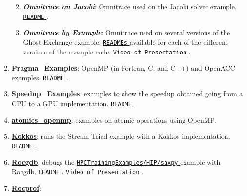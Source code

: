 \documentclass[
]{article}
\providecommand{\tightlist}{%
  \setlength{\itemsep}{0pt}\setlength{\parskip}{0pt}}
\let\oldtexttt\texttt
\renewcommand{\texttt}[1]{
  \colorbox{Light}{\oldtexttt{#1}}
}
\providecommand{\tightlist}{%
  \setlength{\itemsep}{0pt}\setlength{\parskip}{0pt}}
\begin{document}
\begin{enumerate}
  \begin{enumerate}
  \def\labelenumii{\arabic{enumii}.}
  \tightlist
  \item
    \textbf{\emph{Omnitrace on Jacobi}}: Omnitrace used on the Jacobi
    solver example.
    \href{https://github.com/amd/HPCTrainingExamples/tree/main/Omnitrace/README.md}{\texttt{README}}.
  \item
    \textbf{\emph{Omnitrace by Example}}: Omnitrace used on several
    versions of the Ghost Exchange example.
    \href{https://github.com/amd/HPCTrainingExamples/blob/main/MPI-examples/GhostExchange/GhostExchange_ArrayAssign}{\texttt{READMEs}}
    available for each of the different versions of the example code.
    \href{https://vimeo.com/951998260}{\texttt{Video\ of\ Presentation}}.
  \end{enumerate}
\item
  \href{https://github.com/amd/HPCTrainingExamples/tree/main/Pragma_Examples}{\textbf{Pragma\_Examples}}:
  OpenMP (in Fortran, C, and C++) and OpenACC examples.
  \href{https://github.com/amd/HPCTrainingExamples/tree/main/Pragma_Examples}{\texttt{README}}.
\item
  \href{https://github.com/amd/HPCTrainingExamples/tree/main/Speedup_Examples}{\textbf{Speedup\_Examples}}:
  examples to show the speedup obtained going from a CPU to a GPU
  implementation.
  \href{https://github.com/amd/HPCTrainingExamples/blob/main/Speedup_Examples/rzf_training/README.md}{\texttt{README}}.
\item
  \href{https://github.com/amd/HPCTrainingExamples/tree/main/atomics_openmp}{\textbf{atomics\_openmp}}:
  examples on atomic operations using OpenMP.
\item
  \href{https://github.com/amd/HPCTrainingExamples/tree/main/Kokkos}{\textbf{Kokkos}}:
  runs the Stream Triad example with a Kokkos implementation.
  \href{https://github.com/amd/HPCTrainingExamples/tree/main/Kokkos/README.md}{\texttt{README}}.
\item
  \href{https://github.com/amd/HPCTrainingExamples/tree/main/Rocgdb}{\textbf{Rocgdb}}:
  debugs the
  \href{https://github.com/amd/HPCTrainingExamples/tree/main/HIP/saxpy}{\texttt{HPCTrainingExamples/HIP/saxpy}}
  example with
  Rocgdb.\href{https://github.com/amd/HPCTrainingExamples/tree/main/Rocgdb/README.md}{\texttt{README}}.
  \href{https://fs.hlrs.de/projects/par/events/2024/GPU-AMD/day4/AMD\%20debugger.mp4}{\texttt{Video\ of\ Presentation}}.
\item
  \href{https://github.com/amd/HPCTrainingExamples/tree/main/Rocprof}{\textbf{Rocprof}}:

\end{enumerate}
\end{document}
